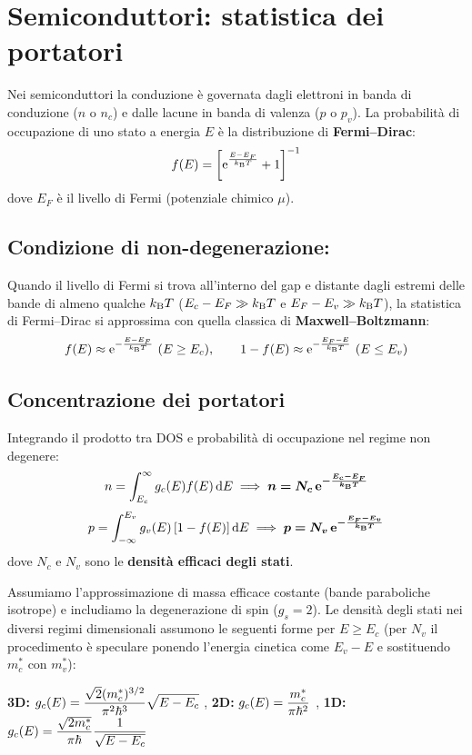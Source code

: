 \section{Semiconduttori: statistica dei portatori}

Nei semiconduttori la conduzione è governata dagli elettroni in banda di conduzione ($n$ o $n_c$) e dalle lacune in banda di valenza ($p$ o $p_v$). La probabilità di occupazione di uno stato a energia $E$ è la distribuzione di \textbf{Fermi--Dirac}:
\[ f(E) = \left[\mathrm{e}^{\frac{E-E_F}{k_{\mathrm{B}} T}}+1\right]^{-1} \]
dove $E_F$ è il livello di Fermi (potenziale chimico $\mu$).

\subsection*{Condizione di non-degenerazione:}
Quando il livello di Fermi si trova all'interno del gap e distante dagli estremi delle bande di almeno qualche $k_{\mathrm{B}} T$ ($E_c-E_F\gg k_{\mathrm{B}} T$ e $E_F-E_v\gg k_{\mathrm{B}} T$), la statistica di Fermi--Dirac si approssima con quella classica di \textbf{Maxwell--Boltzmann}:
\[ f(E)\approx\mathrm{e}^{-\frac{E-E_F}{k_{\mathrm{B}} T}}\ (E\ge E_c), \qquad 1-f(E)\approx\mathrm{e}^{-\frac{E_F-E}{k_{\mathrm{B}} T}}\ (E\le E_v) \]

\subsection{Concentrazione dei portatori}
Integrando il prodotto tra DOS e probabilità di occupazione nel regime non degenere:
\[ n = \int_{E_c}^{\infty} g_c(E)f(E)\,\mathrm{d} E \implies \bm{n = N_c\,\mathrm{e}^{-\frac{E_c-E_F}{k_{\mathrm{B}} T}}} \]
\[ p = \int_{-\infty}^{E_v} g_v(E)\left[1-f(E)\right]\mathrm{d} E \implies \bm{p = N_v\,\mathrm{e}^{-\frac{E_F-E_v}{k_{\mathrm{B}} T}}} \]
dove $N_c$ e $N_v$ sono le \textbf{densità efficaci degli stati}.

\vspace{0.3cm}
Assumiamo l'approssimazione di massa efficace costante (bande paraboliche isotrope) e includiamo la degenerazione di spin ($g_s=2$). Le densità degli stati nei diversi regimi dimensionali assumono le seguenti forme per $E \ge E_c$ (per $N_v$ il procedimento è speculare ponendo l'energia cinetica come $E_v - E$ e sostituendo $m_c^*$ con $m_v^*$):

\textbf{3D:} $\displaystyle g_c(E) = \frac{\sqrt{2}(m_c^*)^{3/2}}{\pi^2\hbar^3}\sqrt{E-E_c}$   \qquad , \qquad 
 \textbf{2D:} $\displaystyle g_c(E) = \frac{m_c^*}{\pi\hbar^2}$  \qquad  , \qquad 
  \textbf{1D:} $\displaystyle g_c(E) = \frac{\sqrt{2m_c^*}}{\pi\hbar}\frac{1}{\sqrt{E-E_c}}$


